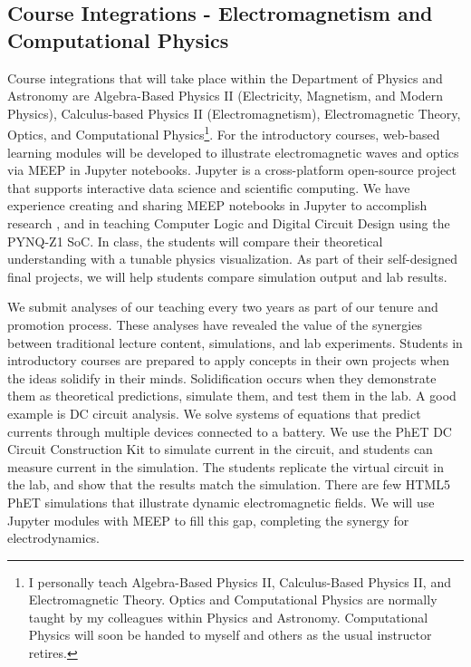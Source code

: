 \documentclass[11pt]{amsart}
\begin{document}
\subsection{Course Integrations - Electromagnetism and Computational Physics}
\label{sec:integration}

Course integrations that will take place within the Department of Physics and Astronomy are Algebra-Based Physics II (Electricity, Magnetism, and Modern Physics), Calculus-based Physics II (Electromagnetism), Electromagnetic Theory, Optics, and Computational Physics\footnote{I personally teach Algebra-Based Physics II, Calculus-Based Physics II, and Electromagnetic Theory.  Optics and Computational Physics are normally taught by my colleagues within Physics and Astronomy.  Computational Physics will soon be handed to myself and others as the usual instructor retires.}.  For the introductory courses, web-based learning modules will be developed to illustrate electromagnetic waves and optics via MEEP in Jupyter notebooks.  Jupyter is a cross-platform open-source project that supports interactive data science and scientific computing.  We have experience creating and sharing MEEP notebooks in Jupyter to accomplish research \cite{electronics10040415}, and in teaching Computer Logic and Digital Circuit Design using the PYNQ-Z1 SoC. In class, the students will compare their theoretical understanding with a tunable physics visualization.  As part of their self-designed final projects, we will help students compare simulation output and lab results.

We submit analyses of our teaching every two years as part of our tenure and promotion process.  These analyses have revealed the value of the synergies between traditional lecture content, simulations, and lab experiments.  Students in introductory courses are prepared to apply concepts in their own projects when the ideas solidify in their minds.  Solidification occurs when they demonstrate them as theoretical predictions, simulate them, and test them in the lab.  A good example is DC circuit analysis.  We solve systems of equations that predict currents through multiple devices connected to a battery.  We use the PhET DC Circuit Construction Kit to simulate current in the circuit, and students can measure current in the simulation.  The students replicate the virtual circuit in the lab, and show that the results match the simulation.  There are few HTML5 PhET simulations that illustrate dynamic electromagnetic fields.  We will use Jupyter modules with MEEP to fill this gap, completing the synergy for electrodynamics. 
\end{document}
